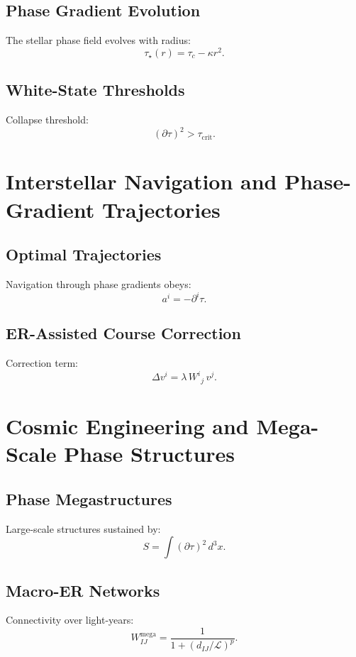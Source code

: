 \section{Phase Gradient Evolution}
The stellar phase field evolves with radius:
\[
\tau_\star(r) = \tau_c - \kappa r^2.
\]

\section{White-State Thresholds}
Collapse threshold:
\[
(\partial\tau)^2 > \tau_{\mathrm{crit}}.
\]

\chapter{Interstellar Navigation and Phase-Gradient Trajectories}

\section{Optimal Trajectories}
Navigation through phase gradients obeys:
\[
a^i = -\partial^i\tau.
\]

\section{ER-Assisted Course Correction}
Correction term:
\[
\Delta v^i = \lambda\, W^i{}_j\, v^j.
\]

\chapter{Cosmic Engineering and Mega-Scale Phase Structures}

\section{Phase Megastructures}
Large-scale structures sustained by:
\[
S = \int (\partial\tau)^2\, d^3x.
\]

\section{Macro-ER Networks}
Connectivity over light-years:
\[
W_{IJ}^{\mathrm{mega}} = \frac{1}{1 + (d_{IJ}/\mathcal{L})^p }.
\]
